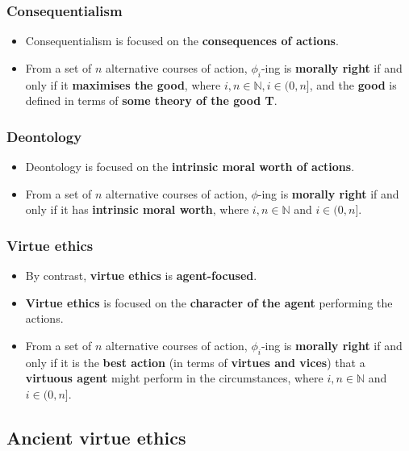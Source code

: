 \documentclass[11pt]{article}
\begin{document}
\subsubsection{Consequentialism}
\label{sec:org1981fe6}
\begin{itemize}
\item Consequentialism is focused on the \textbf{consequences of actions}.
\item From a set of \(n\) alternative courses of action, \(\phi_i\)-ing is \textbf{morally right} if and only if it \textbf{maximises the good}, where \(i, n \in \mathbb{N}, i \in (0, n]\), and the \textbf{good} is defined in terms of \textbf{some theory of the good T}.
\end{itemize}
\subsubsection{Deontology}
\label{sec:org4617d90}
\begin{itemize}
\item Deontology is focused on the \textbf{intrinsic moral worth of actions}.
\item From a set of \(n\) alternative courses of action, \(\phi\)-ing is \textbf{morally right} if and only if it has \textbf{intrinsic moral worth}, where \(i, n \in \mathbb{N}\) and \(i \in (0, n]\).
\end{itemize}
\subsubsection{Virtue ethics}
\label{sec:org1b98b68}
\begin{itemize}
\item By contrast, \textbf{virtue ethics} is \textbf{agent-focused}.
\item \textbf{Virtue ethics} is focused on the \textbf{character of the agent} performing the actions.
\item From a set of \(n\) alternative courses of action, \(\phi_i\)-ing is \textbf{morally right} if and only if it is the \textbf{best action} (in terms of \textbf{virtues and vices}) that a \textbf{virtuous agent} might perform in the circumstances, where \(i, n \in \mathbb{N}\) and \(i \in (0, n]\).
\end{itemize}
\subsection{Ancient virtue ethics}
\label{sec:org4fa28c8}
\end{document}
